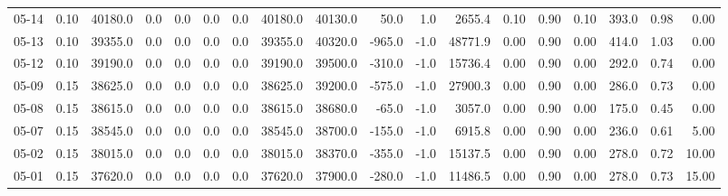\begin{threeparttable}
{\begin{tabular}{lrrrrrrrrrrrrrrrrr}
  05-14 &     0.10 & 40180.0 &               0.0 &               0.0 &                0.0 &                0.0 & 40180.0 & 40130.0 &       50.0 &                      1.0 &              2655.4 &       0.10 &      0.90 &           0.10 &            393.0 &            0.98 &                   0.00 \\
  05-13 &     0.10 & 39355.0 &               0.0 &               0.0 &                0.0 &                0.0 & 39355.0 & 40320.0 &     -965.0 &                     -1.0 &             48771.9 &       0.00 &      0.90 &           0.00 &            414.0 &            1.03 &                   0.00 \\
  05-12 &     0.10 & 39190.0 &               0.0 &               0.0 &                0.0 &                0.0 & 39190.0 & 39500.0 &     -310.0 &                     -1.0 &             15736.4 &       0.00 &      0.90 &           0.00 &            292.0 &            0.74 &                   0.00 \\
  05-09 &     0.15 & 38625.0 &               0.0 &               0.0 &                0.0 &                0.0 & 38625.0 & 39200.0 &     -575.0 &                     -1.0 &             27900.3 &       0.00 &      0.90 &           0.00 &            286.0 &            0.73 &                   0.00 \\
  05-08 &     0.15 & 38615.0 &               0.0 &               0.0 &                0.0 &                0.0 & 38615.0 & 38680.0 &      -65.0 &                     -1.0 &              3057.0 &       0.00 &      0.90 &           0.00 &            175.0 &            0.45 &                   0.00 \\
  05-07 &     0.15 & 38545.0 &               0.0 &               0.0 &                0.0 &                0.0 & 38545.0 & 38700.0 &     -155.0 &                     -1.0 &              6915.8 &       0.00 &      0.90 &           0.00 &            236.0 &            0.61 &                   5.00 \\
  05-02 &     0.15 & 38015.0 &               0.0 &               0.0 &                0.0 &                0.0 & 38015.0 & 38370.0 &     -355.0 &                     -1.0 &             15137.5 &       0.00 &      0.90 &           0.00 &            278.0 &            0.72 &                  10.00 \\
  05-01 &     0.15 & 37620.0 &               0.0 &               0.0 &                0.0 &                0.0 & 37620.0 & 37900.0 &     -280.0 &                     -1.0 &             11486.5 &       0.00 &      0.90 &           0.00 &            278.0 &            0.73 &                  15.00 \\

\end{tabular}}
\end{threeparttable}
